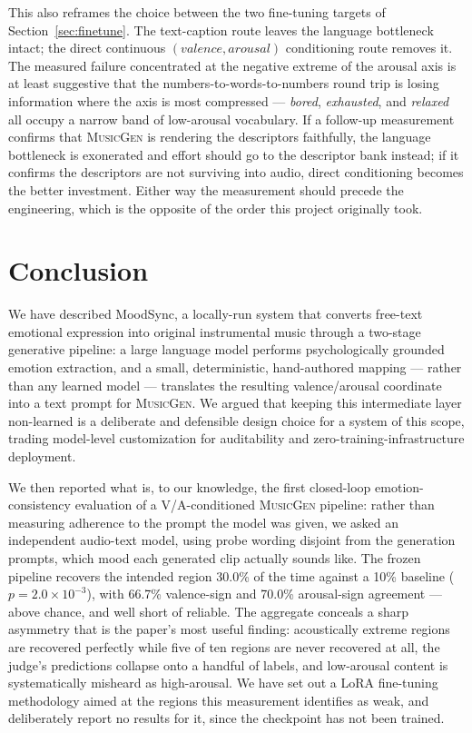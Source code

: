 \documentclass[11pt]{article}
\newcommand{\musicgen}{\textsc{MusicGen}}
\begin{document}
This also reframes the choice between the two fine-tuning targets of Section~\ref{sec:finetune}. The text-caption route leaves the language bottleneck intact; the direct continuous $(valence, arousal)$ conditioning route removes it. The measured failure concentrated at the negative extreme of the arousal axis is at least suggestive that the numbers-to-words-to-numbers round trip is losing information where the axis is most compressed --- \emph{bored}, \emph{exhausted}, and \emph{relaxed} all occupy a narrow band of low-arousal vocabulary. If a follow-up measurement confirms that \musicgen{} is rendering the descriptors faithfully, the language bottleneck is exonerated and effort should go to the descriptor bank instead; if it confirms the descriptors are not surviving into audio, direct conditioning becomes the better investment. Either way the measurement should precede the engineering, which is the opposite of the order this project originally took.

\section{Conclusion}

We have described MoodSync, a locally-run system that converts free-text emotional expression into original instrumental music through a two-stage generative pipeline: a large language model performs psychologically grounded emotion extraction, and a small, deterministic, hand-authored mapping --- rather than any learned model --- translates the resulting valence/arousal coordinate into a text prompt for \musicgen{}. We argued that keeping this intermediate layer non-learned is a deliberate and defensible design choice for a system of this scope, trading model-level customization for auditability and zero-training-infrastructure deployment.

We then reported what is, to our knowledge, the first closed-loop emotion-consistency evaluation of a V/A-conditioned \musicgen{} pipeline: rather than measuring adherence to the prompt the model was given, we asked an independent audio-text model, using probe wording disjoint from the generation prompts, which mood each generated clip actually sounds like. The frozen pipeline recovers the intended region 30.0\% of the time against a 10\% baseline ($p = 2.0\times10^{-3}$), with 66.7\% valence-sign and 70.0\% arousal-sign agreement --- above chance, and well short of reliable. The aggregate conceals a sharp asymmetry that is the paper's most useful finding: acoustically extreme regions are recovered perfectly while five of ten regions are never recovered at all, the judge's predictions collapse onto a handful of labels, and low-arousal content is systematically misheard as high-arousal. We have set out a LoRA fine-tuning methodology aimed at the regions this measurement identifies as weak, and deliberately report no results for it, since the checkpoint has not been trained.
\end{document}
